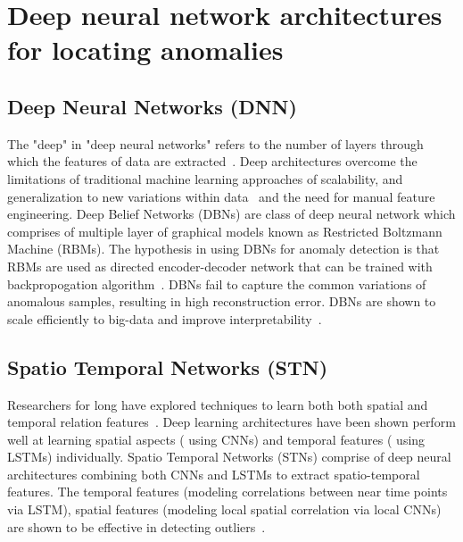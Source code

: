 \section{Deep neural network architectures for locating anomalies}
\label{sec:locatingAnomalieswithNNArchitecture}


\subsection{Deep Neural Networks (DNN)}
\label{sec:dnn}
The "deep" in "deep neural networks" refers to the number of layers through which the features of data are extracted~\cite{schmidhuber2015deep,bengio2009learning}. Deep architectures overcome the limitations of traditional machine learning approaches of scalability, and generalization to new variations within data~\cite{lecun2015deep} and the need for manual feature engineering. Deep Belief Networks (DBNs) are class of deep neural network which comprises of multiple layer of graphical models known as Restricted Boltzmann Machine (RBMs).
The hypothesis in using DBNs for anomaly detection is that RBMs are used as  directed encoder-decoder network that can be trained with backpropogation algorithm~\cite{werbos1990backpropagation}. DBNs fail to capture the common variations of anomalous samples, resulting in high reconstruction error. DBNs  are shown to scale efficiently to big-data and improve interpretability~\cite{wulsin2010semi}.


\subsection{Spatio Temporal Networks (STN)}
\label{sec:stn}
Researchers for long have explored  techniques to learn both both spatial and temporal relation features~\cite{zhang2018detecting}. Deep learning architectures have been shown perform well at learning spatial aspects ( using CNNs) and temporal features ( using LSTMs) individually. Spatio Temporal Networks (STNs) comprise of deep neural architectures combining both CNNs and LSTMs to extract spatio-temporal features. The temporal
features (modeling correlations between near time points via LSTM), spatial features (modeling
local spatial correlation via local CNNs) are shown to be effective in detecting outliers~\cite{lee2018stan,szeker2014spatio,nie2018spatio,dereszynski2011spatiotemporal}.

